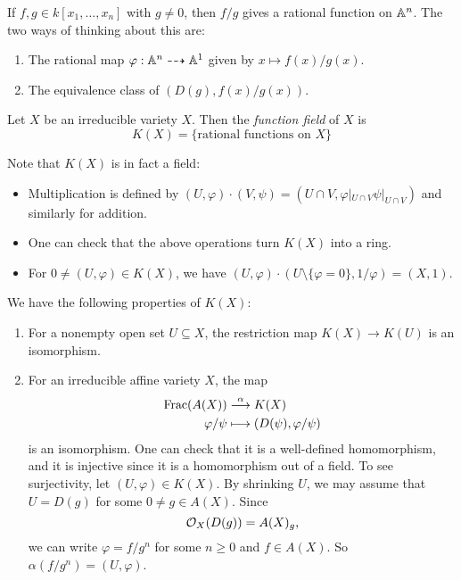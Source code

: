 \pagebreak
\begin{example}
  If $f, g \in k[x_1, \dots, x_n]$
  with $g \ne 0$, then $f / g$ gives a
  rational function on $\mathbb{A}^n$. The
  two ways of thinking about this are:
  \begin{enumerate}
    \item The rational map
      $\varphi : \mathbb{A}^n \dashrightarrow \mathbb{A}^1$
      given by $x \mapsto f(x) / g(x)$.
    \item The equivalence class
      of $(D(g), f(x) / g(x))$.
  \end{enumerate}
\end{example}

\begin{definition}
  Let $X$ be an irreducible variety $X$.
  Then the \emph{function field} of $X$ is
  \[
    K(X) = \{\text{rational functions on } X\}
  \]
\end{definition}

\begin{remark}
  Note that $K(X)$ is in fact a field:
  \begin{itemize}
    \item Multiplication is
      defined by
      $(U, \varphi) \cdot (V, \psi) = (U \cap V, \varphi|_{U \cap V} \psi|_{U \cap V})$
      and similarly for addition.
    \item One can check that
      the above operations turn
      $K(X)$ into a ring.
    \item For $0 \ne (U, \varphi) \in K(X)$,
      we have
      $(U, \varphi)
        \cdot (U \setminus \{\varphi = 0\}, 1 / \varphi)
        = (X, 1)$.
  \end{itemize}
\end{remark}

\begin{remark}
  We have the following properties of
  $K(X)$:
  \begin{enumerate}
    \item For a nonempty open set $U \subseteq X$, the
      restriction map
      $K(X) \to K(U)$
      is an isomorphism.
    \item For an irreducible affine variety
      $X$, the map
      \begin{align*}
        \operatorname{Frac}(A(X)) &\overset{\alpha}{\longrightarrow} K(X) \\
        \varphi / \psi
        &\longmapsto (D(\psi), \varphi / \psi)
      \end{align*}
      is an isomorphism. One can check
      that it is a well-defined
      homomorphism, and it is injective
      since it is a homomorphism out of a
      field. To see surjectivity, let
      $(U, \varphi) \in K(X)$. By shrinking
      $U$, we may assume that $U = D(g)$
      for some $0 \ne g \in A(X)$.
      Since
      \[
        \mathcal{O}_X(D(g)) = A(X)_g,
      \]
      we can write $\varphi = f / g^n$
      for some $n \ge 0$ and $f \in A(X)$.
      So $\alpha(f / g^n) = (U, \varphi)$.
  \end{enumerate}
\end{remark}

